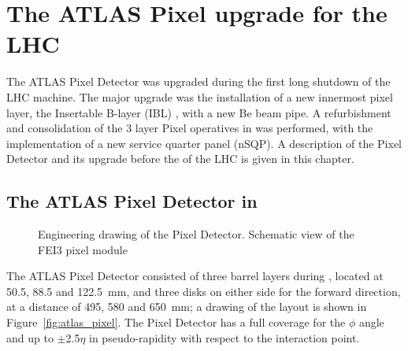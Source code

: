 \section{The ATLAS Pixel upgrade for the LHC \runtwo}\label{sec:IBL_project}
The ATLAS Pixel Detector\cite{atlas_pixel} was upgraded during the first long shutdown of the LHC machine. The major upgrade was the installation of a new innermost pixel layer, the Insertable B-layer (IBL) \cite{Capeans:1291633}, with a new Be beam pipe. A refurbishment and consolidation of the 3 layer Pixel operatives in \runone was performed, with the implementation of a new service quarter panel (nSQP). A description of the Pixel Detector and its upgrade before the \runtwo of the LHC is given in this chapter.

\subsection{The ATLAS Pixel Detector in \runone}
\label{sec:pixel}
\begin{figure}
\caption{ Engineering drawing of the Pixel Detector.  Schematic view of the FEI3 pixel module}
\end{figure}
The ATLAS Pixel Detector consisted of three barrel layers during \runone, located at 50.5, 88.5 and \SI{122.5}{\milli\meter}, and three disks on either side for the forward direction, at a distance of 495, 580 and \SI{650}{\milli\meter}; a drawing of the layout is shown in Figure~\ref{fig:atlas_pixel}. The Pixel Detector has a full coverage for the $\phi$ angle and up to $\pm$2.5$\eta$ in pseudo-rapidity with  respect to the interaction point.

